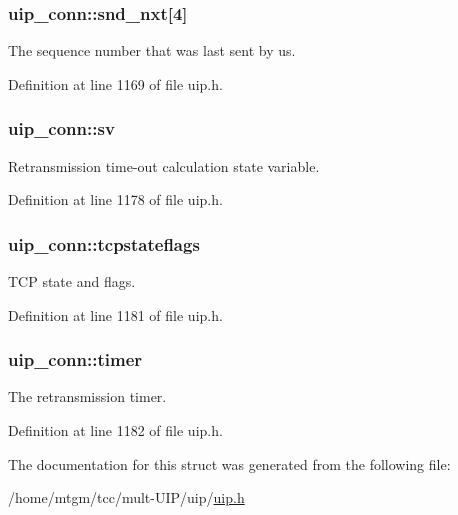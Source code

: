 \hypertarget{structuip__conn_a8f6b08a5ba2a8d75ca7279e2056aa8c6}{
\subsubsection[{snd\_\-nxt}]{ {\bf uip\_\-conn::snd\_\-nxt}\mbox{[}4\mbox{]}}}
\label{structuip__conn_a8f6b08a5ba2a8d75ca7279e2056aa8c6}
The sequence number that was last sent by us. 

Definition at line 1169 of file uip.h.

\hypertarget{structuip__conn_aeb9fcbd3c9b0a795dcd63f33c323d65c}{
\subsubsection[{sv}]{ {\bf uip\_\-conn::sv}}}
\label{structuip__conn_aeb9fcbd3c9b0a795dcd63f33c323d65c}
Retransmission time-\/out calculation state variable. 

Definition at line 1178 of file uip.h.

\hypertarget{structuip__conn_aa5f58074435cdc180f17de69651beebd}{
\subsubsection[{tcpstateflags}]{ {\bf uip\_\-conn::tcpstateflags}}}
\label{structuip__conn_aa5f58074435cdc180f17de69651beebd}
TCP state and flags. 

Definition at line 1181 of file uip.h.

\hypertarget{structuip__conn_a2d9732cf5752d30bd11cb25dc7d0c8d3}{
\subsubsection[{timer}]{ {\bf uip\_\-conn::timer}}}
\label{structuip__conn_a2d9732cf5752d30bd11cb25dc7d0c8d3}
The retransmission timer. 

Definition at line 1182 of file uip.h.



The documentation for this struct was generated from the following file:\begin{DoxyCompactItemize}
\item 
/home/mtgm/tcc/mult-\/UIP/uip/\hyperlink{uip_8h}{uip.h}\end{DoxyCompactItemize}
